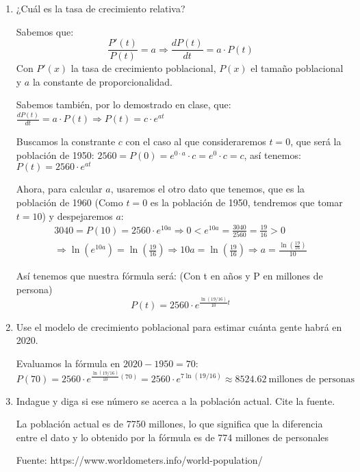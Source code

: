 \documentclass[12pt]{article}
\begin{document}
\begin{enumerate}[\hspace{9px} a)]
    \item ¿Cuál es la tasa de crecimiento relativa?\medskip
    
        Sabemos que: 
        \[\frac{P'(t)}{P(t)}=a \Longrightarrow \frac{dP(t)}{dt}=a\cdot P(t)\]
        Con \(P'(x)\) la tasa de crecimiento poblacional, \(P(x)\) el tamaño poblacional y $a$ la constante de proporcionalidad.\medskip

        Sabemos también, por lo demostrado en clase, que: \(\displaystyle\frac{dP(t)}{dt}=a\cdot P(t) \Longrightarrow P(t)=c\cdot e^{at}\)\medskip

        Buscamos la constrante $c$ con el caso al que consideraremos \(t=0\), que ser\'a la poblaci\'on de 1950: \(2560=P(0)=e^{0\cdot a}\cdot c = e^0\cdot c = c\), as\'i tenemos: \(P(t)=2560\cdot e^{at}\)\medskip

        Ahora, para calcular $a$, usaremos el otro dato que tenemos, que es la poblaci\'on de 1960 (Como \(t=0\) es la poblaci\'on de 1950, tendremos que tomar \(t=10\)) y despejaremos $a$:
        \begin{multline*}
            3040=P(10)=2560\cdot e^{10a} \Longrightarrow 0<e^{10a}=\frac{3040}{2560}=\frac{19}{16}>0 \\\Longrightarrow \ln\left(e^{10a}\right)=\ln\left(\frac{19}{16}\right)\Longrightarrow 10a=\ln\left(\frac{19}{16}\right) \Longrightarrow a=\frac{\ln\left(\frac{19}{16}\right)}{10}
        \end{multline*}

        As\'i tenemos que nuestra f\'ormula ser\'a: (Con t en años y P en millones de persona)
        \[P(t)=2560\cdot e^{\frac{\ln\left(19/16\right)}{10}t}\]

    \item Use el modelo de crecimiento poblacional para estimar cuánta gente habrá en 2020.\medskip
    
        Evaluamos la f\'ormula en \(2020-1950=70\):
        \begin{equation*}
            P(70)=2560\cdot e^{\frac{\ln\left(19/16\right)}{10}(70)}=2560\cdot e^{7\ln\left(19/16\right)}\approx8524.62 \ \text{millones de personas}
        \end{equation*}

    \item Indague y diga si ese número se acerca a la población actual. Cite la fuente.\medskip
    
        La poblaci\'on actual es de 7750 millones, lo que significa que la diferencia entre el dato y lo obtenido por la f\'ormula es de 774 millones de personales \medskip
        
        Fuente: https://www.worldometers.info/world-population/\medskip

\end{enumerate}
\end{document}
